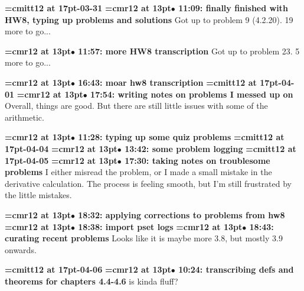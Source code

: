 {\medskip\noindent\bf\font\titlefont=cmitt12 at 17pt-03-31}\medskip
{\smallskip\noindent\bf\font\titlefont=cmr12 at 13pt\titlefont $\bullet$ 11:09: finally finished with HW8, typing up problems and solutions}\smallskip
Got up to problem 9 (4.2.20). 19 more to go...
\par

{\smallskip\noindent\bf\font\titlefont=cmr12 at 13pt\titlefont $\bullet$ 11:57: more HW8 transcription}\smallskip
Got up to problem 23. 5 more to go...
\par

{\smallskip\noindent\bf\font\titlefont=cmr12 at 13pt\titlefont $\bullet$ 16:43: moar hw8 transcription}\smallskip
{\medskip\noindent\bf\font\titlefont=cmitt12 at 17pt-04-01}\medskip
{\smallskip\noindent\bf\font\titlefont=cmr12 at 13pt\titlefont $\bullet$ 17:54: writing notes on problems I messed up on}\smallskip
Overall, things are good. But there are still little issues with some of the arithmetic.
\par

{\smallskip\noindent\bf\font\titlefont=cmr12 at 13pt\titlefont $\bullet$ 11:28: typing up some quiz problems}\smallskip
{\medskip\noindent\bf\font\titlefont=cmitt12 at 17pt-04-04}\medskip
{\smallskip\noindent\bf\font\titlefont=cmr12 at 13pt\titlefont $\bullet$ 13:42: some problem logging}\smallskip
{\medskip\noindent\bf\font\titlefont=cmitt12 at 17pt-04-05}\medskip
{\smallskip\noindent\bf\font\titlefont=cmr12 at 13pt\titlefont $\bullet$ 17:30: taking notes on troublesome problems}\smallskip
I either misread the problem, or I made a small mistake in the derivative calculation. The process is feeling smooth, but I'm still frustrated by the little mistakes.
\par

{\smallskip\noindent\bf\font\titlefont=cmr12 at 13pt\titlefont $\bullet$ 18:32: applying corrections to problems from hw8}\smallskip
{\smallskip\noindent\bf\font\titlefont=cmr12 at 13pt\titlefont $\bullet$ 18:38: import pset logs}\smallskip
{\smallskip\noindent\bf\font\titlefont=cmr12 at 13pt\titlefont $\bullet$ 18:43: curating recent problems}\smallskip
Looks like it is maybe more 3.8, but mostly 3.9 onwards.
\par

{\medskip\noindent\bf\font\titlefont=cmitt12 at 17pt-04-06}\medskip
{\smallskip\noindent\bf\font\titlefont=cmr12 at 13pt\titlefont $\bullet$ 10:24: transcribing defs and theorems for chapters 4.4-4.6} is kinda fluff?
\par

